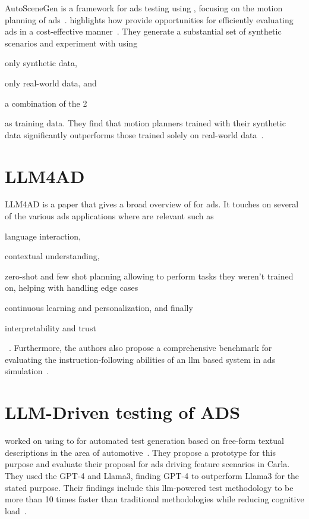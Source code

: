 AutoSceneGen is a framework for \acrshort{ads} testing using ,
focusing on the motion planning of \acrlong{ads}~\cite[14539]{autoSceneGen}.
\citeauthor{autoSceneGen} highlights how  provide opportunities
for efficiently evaluating \acrshort{ads} in a cost-effective
manner~\cite[14539-14540]{autoSceneGen}. They generate a substantial set of synthetic scenarios and
experiment with using \begin{inparaenum}
    \item only synthetic data,
    \item only real-world data, and
    \item a combination of the \num{2} \end{inparaenum} as training data. They find that motion
planners trained with their synthetic data significantly outperforms those trained solely on
real-world data~\cite[14539]{autoSceneGen}.

\section{LLM4AD}

LLM4AD is a paper that gives a broad overview of  for \acrlong{ads}. It touches on
several of the various \acrshort{ads} applications where  are relevant such as
\begin{inparaenum}
    \item language interaction,
    \item contextual understanding,
    \item zero-shot and few shot planning allowing  to perform tasks they weren't trained
    on, helping with handling edge cases
    \item continuous learning and personalization, and finally
    \item interpretability and trust \end{inparaenum}~\cite[2]{LLM4AD}. Furthermore, the authors
also propose a comprehensive benchmark for evaluating the instruction-following abilities of an
\acrshort{llm} based system in \acrshort{ads} simulation~\cite[1]{LLM4AD}.

\section{LLM-Driven testing of ADS}%

\citeauthor{LLMDrivenTestingADS24} worked on using  to for automated test generation
based on free-form textual descriptions in the area of automotive~\cite[173]{LLMDrivenTestingADS24}.
They propose a prototype for this purpose and evaluate their proposal for \acrshort{ads} driving
feature scenarios in Carla. They used the  GPT-4 and Llama3, finding GPT-4 to
outperform Llama3 for the stated purpose. Their findings include this \acrshort{llm}-powered test
methodology to be more than \num{10} times faster than traditional methodologies while reducing
cognitive load~\cite[173]{LLMDrivenTestingADS24}.

